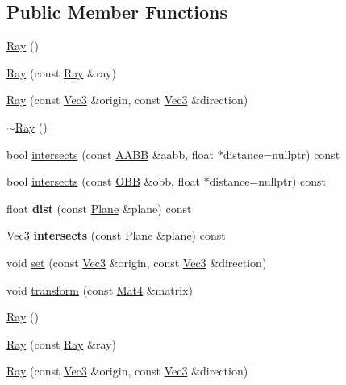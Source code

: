 \subsection*{Public Member Functions}
\begin{DoxyCompactItemize}
\item 
\hyperlink{classRay_a242189a4eefe94210201132de3fec277}{Ray} ()
\item 
\hyperlink{classRay_a155a0b6573cf6a9a2256eb5062523daf}{Ray} (const \hyperlink{classRay}{Ray} \&ray)
\item 
\hyperlink{classRay_a9753a2cb8797a9c4d96883d79085d4ee}{Ray} (const \hyperlink{classVec3}{Vec3} \&origin, const \hyperlink{classVec3}{Vec3} \&direction)
\item 
\hyperlink{classRay_a8b0e575ce5df046c0c7615c32a96a46f}{$\sim$\+Ray} ()
\item 
bool \hyperlink{classRay_a2db2a0a4c6b8f67500d5b8b6542f5d50}{intersects} (const \hyperlink{classAABB}{A\+A\+BB} \&aabb, float $\ast$distance=nullptr) const
\item 
bool \hyperlink{classRay_a8cab9601415189aa8b138805c1880b12}{intersects} (const \hyperlink{classOBB}{O\+BB} \&obb, float $\ast$distance=nullptr) const
\item 
\mbox{\label{classRay_ac9e02b5199938055fc7e38c88226869c}} 
float {\bfseries dist} (const \hyperlink{classPlane}{Plane} \&plane) const
\item 
\mbox{\label{classRay_a43032ec38dddd20e36193a710979f63a}} 
\hyperlink{classVec3}{Vec3} {\bfseries intersects} (const \hyperlink{classPlane}{Plane} \&plane) const
\item 
void \hyperlink{classRay_a7a3565df0919fbffd4cbf4cf3b71b44b}{set} (const \hyperlink{classVec3}{Vec3} \&origin, const \hyperlink{classVec3}{Vec3} \&direction)
\item 
void \hyperlink{classRay_a23b3f4f7ecd94ef4ac74dba7c65fe110}{transform} (const \hyperlink{classMat4}{Mat4} \&matrix)
\item 
\hyperlink{classRay_a2e3d2c29f2df4ab3da10da79d4acb852}{Ray} ()
\item 
\hyperlink{classRay_a155a0b6573cf6a9a2256eb5062523daf}{Ray} (const \hyperlink{classRay}{Ray} \&ray)
\item 
\hyperlink{classRay_a9753a2cb8797a9c4d96883d79085d4ee}{Ray} (const \hyperlink{classVec3}{Vec3} \&origin, const \hyperlink{classVec3}{Vec3} \&direction)
\item 

\end{DoxyCompactItemize}
